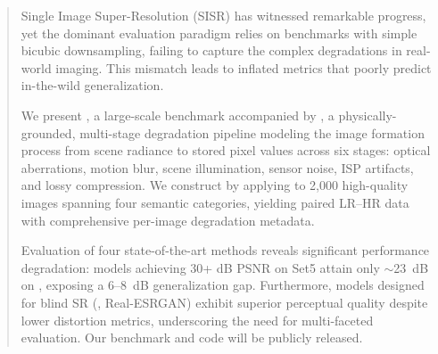 \begin{abstract}
\noindent
Single Image Super-Resolution (SISR) has witnessed remarkable progress, yet the dominant evaluation paradigm relies on benchmarks with simple bicubic downsampling, failing to capture the complex degradations in real-world imaging.
This mismatch leads to inflated metrics that poorly predict in-the-wild generalization.

We present \dataset, a large-scale benchmark accompanied by \pipeline, a physically-grounded, multi-stage degradation pipeline modeling the image formation process from scene radiance to stored pixel values across six stages: optical aberrations, motion blur, scene illumination, sensor noise, ISP artifacts, and lossy compression.
We construct \dataset by applying \pipeline to 2{,}000 high-quality images spanning four semantic categories, yielding paired LR--HR data with comprehensive per-image degradation metadata.

Evaluation of four state-of-the-art methods reveals significant performance degradation: models achieving 30+ dB PSNR on Set5 attain only $\sim$23~dB on \dataset, exposing a 6--8~dB generalization gap.
Furthermore, models designed for blind SR (\eg, Real-ESRGAN) exhibit superior perceptual quality despite lower distortion metrics, underscoring the need for multi-faceted evaluation.
Our benchmark and code will be publicly released.
\end{abstract}
